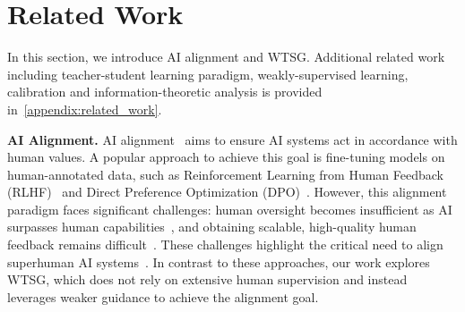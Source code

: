 \section{Related Work}

In this section, we introduce AI alignment and WTSG.
Additional related work including teacher-student learning paradigm, weakly-supervised learning, calibration and information-theoretic analysis is provided in~\cref{appendix:related_work}.





\noindent \textbf{AI Alignment.}
AI alignment~\citep{ji2023ai,shen2023large} aims to ensure AI systems act in accordance with human values. 
A popular approach to achieve this goal is fine-tuning models on human-annotated data, such as Reinforcement Learning from Human Feedback (RLHF)~\citep{ouyang2022training,bai2022training} and Direct Preference Optimization (DPO)~\citep{rafailov2024direct}. 
However, this alignment paradigm faces significant challenges: human oversight becomes insufficient as AI surpasses human capabilities~\citep{kim2024road}, and obtaining scalable, high-quality human feedback remains difficult~\citep{casper2023open}. 
These challenges highlight the critical need to align superhuman AI systems~\citep{openai_superalignment}.
In contrast to these approaches, our work explores WTSG, which does not rely on extensive human supervision and instead leverages weaker guidance to achieve the alignment goal.











